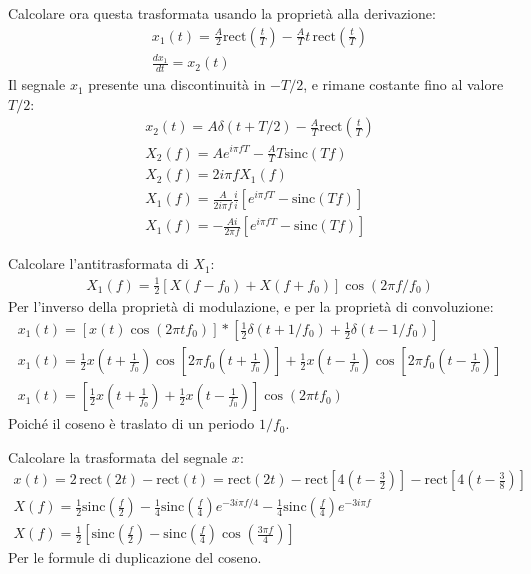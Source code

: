 \documentclass{article}
\numberwithin{equation}{subsection}
\begin{document}
Calcolare ora questa trasformata usando la proprietà alla derivazione:
\begin{gather*}
    x_1(t)=\displaystyle\frac{A}{2}\mbox{rect}\left(\frac{t}{T}\right)-\frac{A}{T}t\,\mbox{rect}\left(\frac{t}{T}\right)\\
    \displaystyle\frac{dx_1}{dt}=x_2(t)
\end{gather*}
Il segnale $x_1$ presente una discontinuità in $-T/2$, e rimane costante fino al valore $T/2$:
\begin{gather*}
    x_2(t)=A\delta(t+T/2)-\displaystyle\frac{A}{T}\mbox{rect}\left(\frac{t}{T}\right)\\
    X_2(f)=Ae^{i\pi fT}-\displaystyle\frac{A}{T}T\mbox{sinc}(Tf)\\
    X_2(f)=2i\pi fX_1(f)\\
    X_1(f)=\displaystyle\frac{A}{2i\pi f}\frac{i}{i}\left[e^{i\pi fT}-\mbox{sinc}(Tf)\right]\\
    X_1(f)=\displaystyle-\frac{Ai}{2\pi f}\left[e^{i\pi fT}-\mbox{sinc}(Tf)\right]
\end{gather*}


Calcolare l'antitrasformata di $X_1$:
\begin{gather*}
    X_1(f)=\displaystyle\frac{1}{2}\left[X(f-f_0)+X(f+f_0)\right]\cos(2\pi f/f_0)
\end{gather*}
Per l'inverso della proprietà di modulazione, e per la proprietà di convoluzione:
\begin{gather*}
    x_1(t)=\left[x(t)\cos(2\pi tf_0)\right]*\left[\displaystyle\frac{1}{2}\delta(t+1/f_0)+\frac{1}{2}\delta(t-1/f_0)\right]\\
    x_1(t)=\displaystyle\frac{1}{2}x\left(t+\frac{1}{f_0}\right)\cos\left[2\pi f_0\left(t+\frac{1}{f_0}\right)\right]+\frac{1}{2}x\left(t-\frac{1}{f_0}\right)\cos\left[2\pi f_0\left(t-\frac{1}{f_0}\right)\right]\\
    x_1(t)=\left[\displaystyle\frac{1}{2}x\left(t+\frac{1}{f_0}\right)+\frac{1}{2}x\left(t-\frac{1}{f_0}\right)\right]\cos(2\pi tf_0)
\end{gather*}
Poiché il coseno è traslato di un periodo $1/f_0$. 


Calcolare la trasformata del segnale $x$:
\begin{gather*}
    x(t)=2\,\mbox{rect}(2t)-\mbox{rect}(t)=\mbox{rect}(2t)-\mbox{rect}\left[\displaystyle4\left(t-\frac{3}{2}\right)\right]-\mbox{rect}\left[\displaystyle4\left(t-\frac{3}{8}\right)\right]\\
    X(f)=\displaystyle\frac{1}{2}\mbox{sinc}\left(\frac{f}{2}\right)-\frac{1}{4}\mbox{sinc}\left(\frac{f}{4}\right)e^{-3i\pi f/4}-\frac{1}{4}\mbox{sinc}\left(\frac{f}{4}\right)e^{-3i\pi f}\\
    X(f)=\displaystyle\frac{1}{2}\left[\mbox{sinc}\left(\frac{f}{2}\right)-\mbox{sinc}\left(\frac{f}{4}\right)\cos\left(\frac{3\pi f}{4}\right)\right]
\end{gather*}
Per le formule di duplicazione del coseno. 
\end{document}
